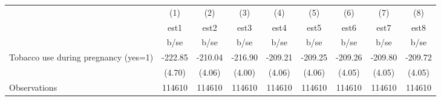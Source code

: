 {
\def\sym#1{\ifmmode^{#1}\else\(^{#1}\)\fi}
\begin{tabular}{l*{8}{c}}
\hline\hline
                                                  &\multicolumn{1}{c}{(1)}&\multicolumn{1}{c}{(2)}&\multicolumn{1}{c}{(3)}&\multicolumn{1}{c}{(4)}&\multicolumn{1}{c}{(5)}&\multicolumn{1}{c}{(6)}&\multicolumn{1}{c}{(7)}&\multicolumn{1}{c}{(8)}\\
                                                  &        est1&        est2&        est3&        est4&        est5&        est6&        est7&        est8\\
                                                  &        b/se&        b/se&        b/se&        b/se&        b/se&        b/se&        b/se&        b/se\\
\hline
Tobacco use during pregnancy (yes=1)              &     -222.85&     -210.04&     -216.90&     -209.21&     -209.25&     -209.26&     -209.80&     -209.72\\
                                                  &      (4.70)&      (4.06)&      (4.00)&      (4.06)&      (4.06)&      (4.05)&      (4.05)&      (4.05)\\
\hline
Observations                                      &      114610&      114610&      114610&      114610&      114610&      114610&      114610&      114610\\
\hline\hline
\end{tabular}
}
